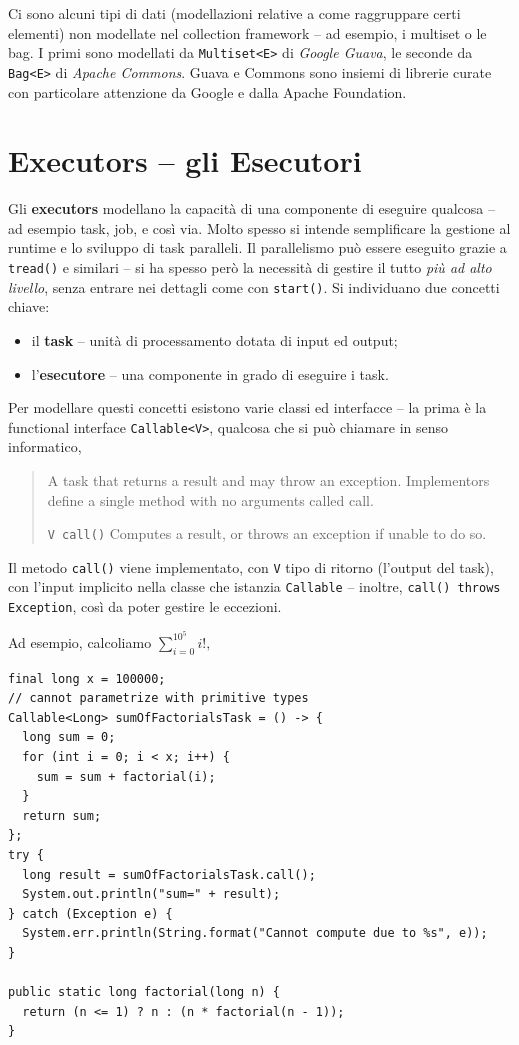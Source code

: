 \documentclass[\fontsizeclass,twocolumn]{\classname}
\theoremstyle{definition}
\theoremstyle{definition}
\begin{document}
Ci sono alcuni tipi di dati (modellazioni relative a come raggruppare certi
elementi) non modellate nel collection framework -- ad esempio, i multiset o le
bag. I primi sono modellati da \texttt{Multiset<E>} di \emph{Google Guava}, le
seconde da \texttt{Bag<E>} di \emph{Apache Commons}. Guava e Commons sono
insiemi di librerie curate con particolare attenzione da Google e dalla Apache
Foundation.

\chapter{Executors -- gli Esecutori}

Gli \textbf{executors} modellano la capacità di una componente di eseguire
qualcosa -- ad esempio task, job, e così via. Molto spesso si intende
semplificare la gestione al runtime e lo sviluppo di task paralleli. Il
parallelismo può essere eseguito grazie a \texttt{tread()} e similari -- si ha
spesso però la necessità di gestire il tutto \emph{più ad alto livello}, senza
entrare nei dettagli come con \texttt{start()}. Si individuano due concetti
chiave:
\begin{itemize}
    \item il \textbf{task} -- unità di processamento dotata di input ed output;
    \item l'\textbf{esecutore} -- una componente in grado di eseguire i task.
\end{itemize}

Per modellare questi concetti esistono varie classi ed interfacce -- la prima è
la functional interface \texttt{Callable<V>}, qualcosa che si può chiamare in
senso informatico,
\begin{quote}
    \footnotesize{A task that returns a result and may throw an exception. Implementors define a single method with no arguments called call.

    \texttt{V 	call()} 	Computes a result, or throws an exception if unable to do so.}
\end{quote}

Il metodo \texttt{call()} viene implementato, con \texttt{V} tipo di ritorno
(l'output del task), con l'input implicito nella classe che istanzia
\texttt{Callable} -- inoltre, \texttt{call() throws Exception}, così da poter
gestire le eccezioni.

Ad esempio, calcoliamo $\displaystyle \sum_{i=0}^{10^5} i!,$

\begin{lstlisting}
final long x = 100000;
// cannot parametrize with primitive types
Callable<Long> sumOfFactorialsTask = () -> {
  long sum = 0;
  for (int i = 0; i < x; i++) {
    sum = sum + factorial(i);
  }
  return sum;
};
try {
  long result = sumOfFactorialsTask.call();
  System.out.println("sum=" + result);
} catch (Exception e) {
  System.err.println(String.format("Cannot compute due to %s", e));
}

public static long factorial(long n) {
  return (n <= 1) ? n : (n * factorial(n - 1));
}
\end{lstlisting}
\end{document}
